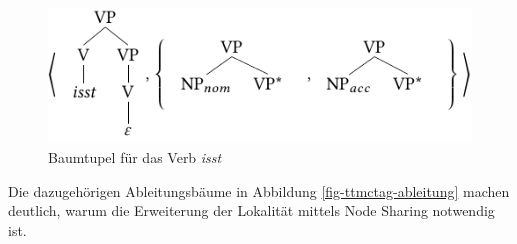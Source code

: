 \begin{figure}[t]
\centering
\includegraphics{graphics/abb71.pdf}
\caption{\label{fig-ttmctag-tupel}Baumtupel für das Verb {\it isst}}
\end{figure}

\noindent Die dazugehörigen Ableitungsbäume in Abbildung \ref{fig-ttmctag-ableitung} machen deutlich, warum die Erweiterung der Lokalität mittels Node Sharing notwendig ist. 
